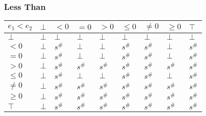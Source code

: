 \documentclass{beamer}
\begin{document}
        \begin{frame}
            \frametitle{Less Than}
        \begin{table}
            \begin{tabular}{|l|l|l|l|l|l|l|l|l|}
            \hline
            $e_1 < e_2$ & $\bot$ & $<0$   & $=0$   & $>0$   & $\le 0$ & $\ne 0$ & $\ge 0$ & $\top$ \\ \hline
            $\bot$      & $\bot$ & $\bot$ & $\bot$ & $\bot$ & $\bot$  & $\bot$  & $\bot$  & $\bot$ \\ \hline
            $<0$        & $\bot$ & $s^\#$ & $\bot$ & $\bot$ & $s^\#$  & $s^\#$  & $\bot$  & $s^\#$ \\ \hline
            $=0$        & $\bot$ & $s^\#$ & $\bot$ & $\bot$ & $s^\#$  & $s^\#$  & $\bot$  & $s^\#$ \\ \hline
            $>0$        & $\bot$ & $s^\#$ & $s^\#$ & $s^\#$ & $s^\#$  & $s^\#$  & $s^\#$  & $s^\#$ \\ \hline
            $\le 0$     & $\bot$ & $s^\#$ & $\bot$ & $\bot$ & $s^\#$  & $s^\#$  & $\bot$  & $s^\#$ \\ \hline
            $\ne 0$     & $\bot$ & $s^\#$ & $s^\#$ & $s^\#$ & $s^\#$  & $s^\#$  & $s^\#$  & $s^\#$ \\ \hline
            $\ge 0$     & $\bot$ & $s^\#$ & $s^\#$ & $s^\#$ & $s^\#$  & $s^\#$  & $s^\#$  & $s^\#$ \\ \hline
            $\top$      & $\bot$ & $s^\#$ & $s^\#$ & $s^\#$ & $s^\#$  & $s^\#$  & $s^\#$  & $s^\#$ \\ \hline
            \end{tabular}
            \end{table}
        \end{frame}
\end{document}
